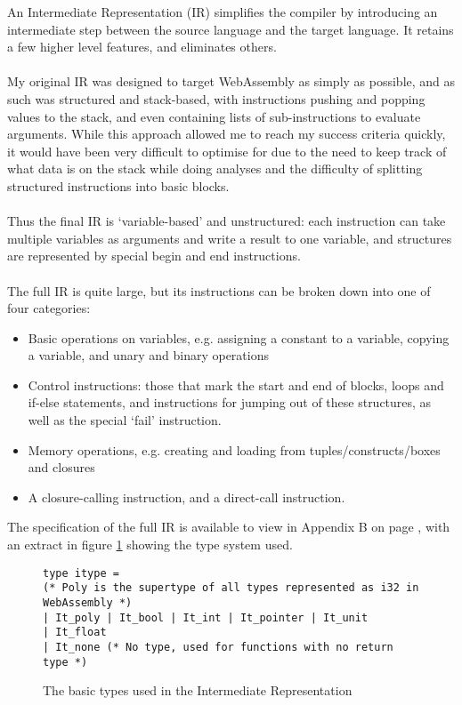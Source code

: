 An Intermediate Representation (IR) simplifies the compiler by introducing an intermediate step between the source language and the target language. It retains a few higher level features, and eliminates others.
\\\\
My original IR was designed to target WebAssembly as simply as possible, and as such was structured and stack-based, with instructions pushing and popping values to the stack, and even containing lists of sub-instructions to evaluate arguments. While this approach allowed me to reach my success criteria quickly, it would have been very difficult to optimise for due to the need to keep track of what data is on the stack while doing analyses and the difficulty of splitting structured instructions into basic blocks.
\\\\
Thus the final IR is `variable-based' and unstructured: each instruction can take multiple variables as arguments and write a result to one variable, and structures are represented by special begin and end instructions.
\\\\
The full IR is quite large, but its instructions can be broken down into one of four categories:
\begin{itemize}
\item Basic operations on variables, e.g. assigning a constant to a variable, copying a variable, and unary and binary operations
\item Control instructions: those that mark the start and end of blocks, loops and if-else statements, and instructions for jumping out of these structures, as well as the special `fail' instruction.
\item Memory operations, e.g. creating and loading from tuples/constructs/boxes and closures
\item A closure-calling instruction, and a direct-call instruction.
\end{itemize}
The specification of the full IR is available to view in Appendix B on page \pageref{chapter:ir}, with an extract in figure \ref{fig:ir} showing the type system used.
\begin{figure}[h]
\begin{verbatim}
type itype =
(* Poly is the supertype of all types represented as i32 in WebAssembly *)
| It_poly | It_bool | It_int | It_pointer | It_unit
| It_float
| It_none (* No type, used for functions with no return type *)
\end{verbatim}
\caption{The basic types used in the Intermediate Representation}
\label{fig:ir}
\end{figure}
